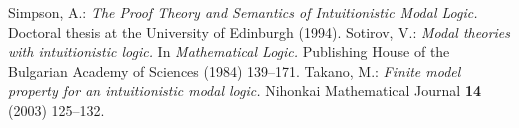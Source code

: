 \documentclass[draft]{article}
\begin{document}
\begin{thebibliography}{}
%
%
%
%
%
%
%
%
%
%
%
%
Simpson, A.:
{\it The Proof Theory and Semantics of Intuitionistic Modal Logic.}
Doctoral thesis at the University of Edinburgh (1994).
%
%
%
%
Sotirov, V.:
{\it Modal theories with intuitionistic logic.}
In {\it Mathematical Logic.}
Publishing House of the Bulgarian Academy of Sciences (1984) 139--171.
%
%
%
%
%
%
%
%
Takano, M.:
{\it Finite model property for an intuitionistic modal logic.}
Nihonkai Mathematical Journal {\bf 14} (2003) 125--132.
%
%
%
%
%
%
%
%

\end{thebibliography}
\end{document}
